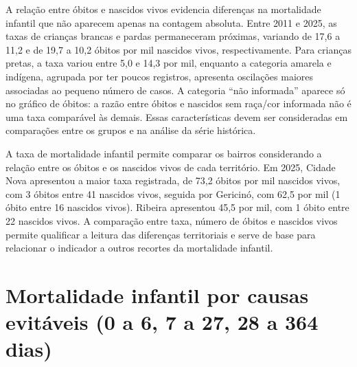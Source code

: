 
A relação entre óbitos e nascidos vivos evidencia diferenças na mortalidade infantil que não aparecem apenas na contagem absoluta. Entre 2011 e 2025, as taxas de crianças brancas e pardas permaneceram próximas, variando de 17,6 a 11,2 e de 19,7 a 10,2 óbitos por mil nascidos vivos, respectivamente. Para crianças pretas, a taxa variou entre 5,0 e 14,3 por mil, enquanto a categoria amarela e indígena, agrupada por ter poucos registros, apresenta oscilações maiores associadas ao pequeno número de casos. A categoria “não informada” aparece só no gráfico de óbitos: a razão entre óbitos e nascidos sem raça/cor informada não é uma taxa comparável às demais. Essas características devem ser consideradas em comparações entre os grupos e na análise da série histórica.


A taxa de mortalidade infantil permite comparar os bairros considerando a relação entre os óbitos e os nascidos vivos de cada território. Em 2025, Cidade Nova apresentou a maior taxa registrada, de 73,2 óbitos por mil nascidos vivos, com 3 óbitos entre 41 nascidos vivos, seguida por Gericinó, com 62,5 por mil (1 óbito entre 16 nascidos vivos). Ribeira apresentou 45,5 por mil, com 1 óbito entre 22 nascidos vivos. A comparação entre taxa, número de óbitos e nascidos vivos permite qualificar a leitura das diferenças territoriais e serve de base para relacionar o indicador a outros recortes da mortalidade infantil.


\section{Mortalidade infantil por causas evitáveis (0 a 6, 7 a 27, 28 a 364 dias)}

